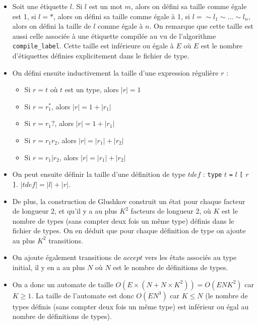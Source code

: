 \documentclass[a4paper, 11pt]{article}
\begin{document}
\begin{itemize}
\item Soit une étiquette $l$. Si $l$ est un mot $m$, alors on défini sa taille
  comme égale est 1, si $l = *$, alors on défini sa taille comme égale à 1, si
  $l = \sim l_1 \sim ... \sim l_n$, alors on défini la taille de $l$ comme égale
  à $n$. On remarque que cette taille est aussi celle associée à une étiquette
  compilée au vu de l'algorithme \texttt{compile\_label}. Cette taille est
  inférieure ou égale à $E$ où $E$ est le nombre d'étiquettes définies
  explicitement dans le fichier de type.
\item On défini ensuite inductivement la taille d'une expression régulière $r$ :
  \begin{itemize}
  \item Si $r = t$ où $t$ est un type, alors $|r| = 1$
  \item Si $r = r_1^*$, alors $|r| = 1 + |r_1|$
  \item Si $r = r_1?$, alors $|r| = 1 + |r_1|$
  \item Si $r = r_1r_2$, alors $|r| = |r_1| + |r_2|$
  \item Si $r = r_1 | r_2$, alors $|r| = |r_1| + |r_2|$
  \end{itemize}
\item On peut ensuite définir la taille d'une définition de type $tdef$ :
  \texttt{type} $t$ \texttt{=} $l$ \texttt{[} $r$ \texttt{]}.
  $|tdef| = |l| + |r|$.
\item De plus, la construction de Glushkov construit un état pour chaque facteur
  de longueur 2, et qu'il y a au plus $K^2$ facteurs de longueur 2, où $K$ est
  le nombre de types (sans compter deux fois un même type) définis dans le
  fichier de types. On en déduit que pour chaque définition de type on ajoute au
  plus $K^2$ transitions.
\item On ajoute également transitions de $accept$ vers les états associés au
  type initial, il y en a au plus $N$ où $N$ est le nombre de définitions de
  types.
\item On a donc un automate de taille
  $O(E \times (N + N \times K^2)) = O(ENK^2)$ car $K \geq 1$. La taille de
  l'automate est donc $O(EN^3)$ car $K \leq N$ (le nombre de types définis (sans
  compter deux fois un même type) est inférieur ou égal au nombre de définitions
  de types).
\end{itemize}
\end{document}
